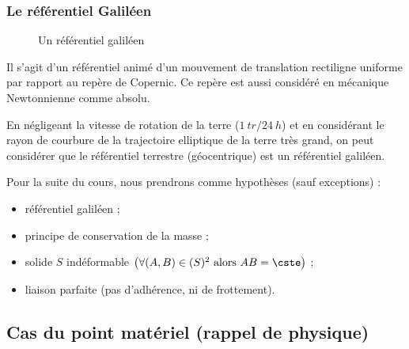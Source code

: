 \documentclass[12pt]{article}
\begin{document}
\subsubsection{Le référentiel Galiléen}

\begin{figure}
  \centering
  \vspace{-1.5em}
  \caption{Un référentiel galiléen}
  \vspace{-2em}
\end{figure}
Il s'agit d'un référentiel animé d'un mouvement de translation rectiligne uniforme par rapport au repère de Copernic. Ce repère est aussi considéré en mécanique Newtonnienne comme absolu.

En négligeant la vitesse de rotation de la terre ($\SI{1}{tr} /\SI{24}{h}$) et en considérant le rayon de courbure de la trajectoire elliptique de la terre très grand, on peut considérer que le référentiel terrestre (géocentrique) est un référentiel galiléen.

\vspace{1em}
Pour la suite du cours, nous prendrons comme hypothèses (sauf exceptions) :
\begin{itemize}
\item référentiel galiléen ;
\item principe de conservation de la masse ;
\item solide $S$ indéformable $\left(\forall (A, B)\in (S)^2 \text{ alors } AB = \cste\right)$ ;
\item liaison parfaite (pas d'adhérence, ni de frottement).
\end{itemize}

\newpage
\subsection{Cas du point matériel (rappel de physique)}
\end{document}
